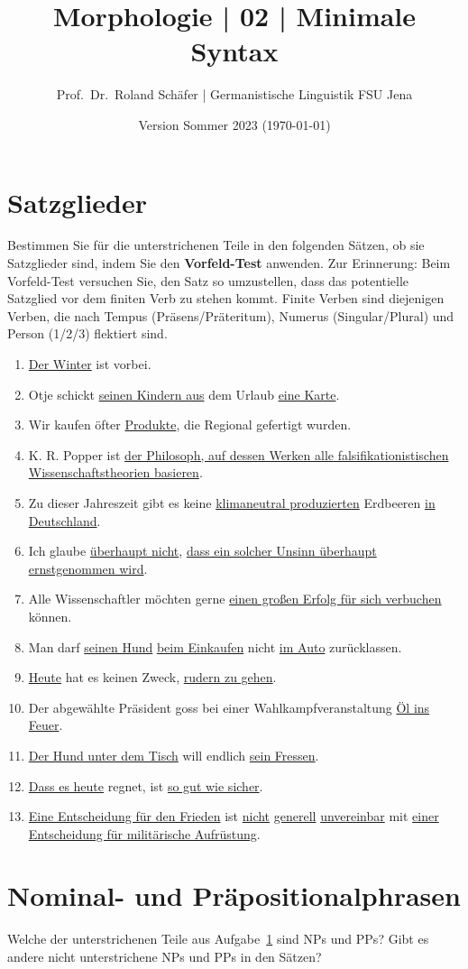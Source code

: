 \documentclass[12pt,a4paper,twoside]{article}
\author{Prof.\ Dr.\ Roland Schäfer | Germanistische Linguistik FSU Jena}
\title{Morphologie | 02 | Minimale Syntax}
\date{Version Sommer 2023 (\today)}
\begin{document}
\maketitle

\section{Satzglieder}\label{sec:satzglieder}

Bestimmen Sie für die unterstrichenen Teile in den folgenden Sätzen, ob sie Satzglieder sind, indem Sie den \textbf{Vorfeld-Test} anwenden.
Zur Erinnerung: Beim Vorfeld-Test versuchen Sie, den Satz so umzustellen, dass das potentielle Satzglied vor dem finiten Verb zu stehen kommt.
Finite Verben sind diejenigen Verben, die nach Tempus (Präsens\slash Präteritum), Numerus (Singular\slash Plural) und Person (1\slash 2\slash 3) flektiert sind.

\begin{enumerate}
  \item \ul{Der Winter} ist vorbei.
  \item Otje schickt \ul{seinen Kindern aus} dem Urlaub \ul{eine Karte}.
  \item Wir kaufen öfter \ul{Produkte}, die Regional gefertigt wurden.
  \item K. R. Popper ist \ul{der Philosoph, auf dessen Werken alle falsifikationistischen Wissenschaftstheorien basieren}.
  \item Zu dieser Jahreszeit gibt es keine \ul{klimaneutral produzierten} Erdbeeren \ul{in Deutschland}.
  \item Ich glaube \ul{überhaupt nicht}, \ul{dass ein solcher Unsinn überhaupt ernstgenommen wird}.
  \item Alle Wissenschaftler möchten gerne \ul{einen großen Erfolg für sich verbuchen} können.
  \item Man darf \ul{seinen Hund} \ul{beim Einkaufen} nicht \ul{im Auto} zurücklassen.
  \item \ul{Heute} hat es keinen Zweck, \ul{rudern zu gehen}.
  \item Der abgewählte Präsident goss bei einer Wahlkampfveranstaltung \ul{Öl ins Feuer}.
  \item \ul{Der Hund unter dem Tisch} will endlich \ul{sein Fressen}.
  \item \ul{Dass es heute} regnet, ist \ul{so gut wie sicher}.
  \item \ul{Eine Entscheidung für den Frieden} ist \ul{nicht} \ul{generell} \ul{unvereinbar} mit \ul{einer Entscheidung für militärische Aufrüstung}.
\end{enumerate}

\section{Nominal- und Präpositionalphrasen}

Welche der unterstrichenen Teile aus Aufgabe~\ref{sec:satzglieder} sind NPs und PPs?
Gibt es andere nicht unterstrichene NPs und PPs in den Sätzen?
\end{document}
